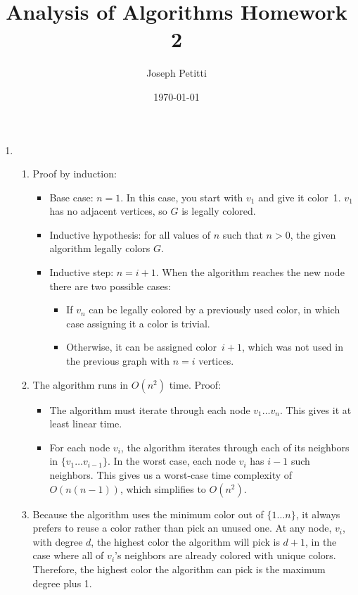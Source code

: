 \documentclass[a4paper, 10pt]{article}
\title{Analysis of Algorithms Homework 2}
\author{Joseph Petitti}
\date{\today}
\begin{document}
\maketitle

\begin{enumerate}
	\item \begin{enumerate}
			\item Proof by induction:
				\begin{itemize}
					\item Base case: $n = 1$. In this case, you start with
						$v_1$ and give it color~1. $v_1$ has no adjacent
						vertices, so $G$ is legally colored.
					\item Inductive hypothesis: for all values of $n$ such that
						$n > 0$, the given algorithm legally colors $G$.
					\item Inductive step: $n = i + 1$. When the algorithm
						reaches the new node there are two possible cases:
						\begin{itemize}
							\item If $v_n$ can be legally colored by a
								previously used color, in which case assigning
								it a color is trivial.
							\item Otherwise, it can be assigned color~$i + 1$,
								which was not used in the previous graph with $n
								= i$ vertices.
						\end{itemize}
				\end{itemize}

			\item The algorithm runs in $O(n^2)$ time. Proof:
				\begin{itemize}
					\item The algorithm must iterate through each node $v_1
						\dots v_n$. This gives it at least linear time.
					\item For each node $v_i$, the algorithm iterates through
						each of its neighbors in $\{ v_1 \dots v_{i-1} \}$. In
						the worst case, each node $v_i$ has $i-1$ such
						neighbors. This gives us a worst-case time complexity of
						$O(n (n - 1))$, which simplifies to $O(n^2)$.
				\end{itemize}

			\item Because the algorithm uses the minimum color out of $\{ 1
				\dots n \}$, it always prefers to reuse a color rather than pick
				an unused one. At any node, $v_i$, with degree $d$, the
				highest color the algorithm will pick is $d + 1$, in the case
				where all of $v_i$'s neighbors are already colored with unique
				colors. Therefore, the highest color the algorithm can pick is
				the maximum degree plus 1.


\end{enumerate}
\end{enumerate}
\end{document}
